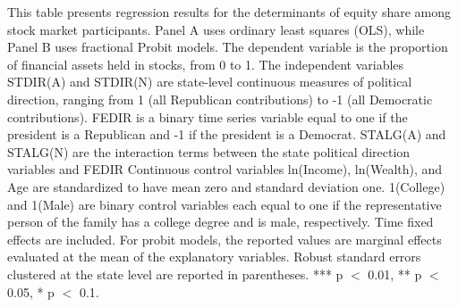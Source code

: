 \begin{table}[htbp]
    \centering
    \caption{Equity Share and State Politics}
    \label{tab:4}

    \begin{minipage}{\textwidth}
    \small This table presents regression results for the determinants of equity share among stock market participants. Panel A uses ordinary least squares (OLS), while Panel B uses fractional Probit models. The dependent variable is the proportion of financial assets held in stocks, from 0 to 1. The independent variables STDIR(A) and STDIR(N) are state-level continuous measures of political direction, ranging from 1 (all Republican contributions) to -1 (all Democratic contributions). FEDIR is a binary time series variable equal to one if the president is a Republican and -1 if the president is a Democrat. STALG(A) and STALG(N) are the interaction terms between the state political direction variables and FEDIR Continuous control variables ln(Income), ln(Wealth), and Age are standardized to have mean zero and standard deviation one. 1(College) and 1(Male) are binary control variables each equal to one if the representative person of the family has a college degree and is male, respectively. Time fixed effects are included. For probit models, the reported values are marginal effects evaluated at the mean of the explanatory variables. Robust standard errors clustered at the state level are reported in parentheses. *** p $<$ 0.01, ** p $<$ 0.05, * p $<$ 0.1.
    \end{minipage}

    \small 

    \vspace{1ex}
    
    \begin{subtable}{\textwidth}
        \caption{Ordinary Least Squares (OLS)}
        \label{tab:4a}
        
    \end{subtable}
\end{table}

\begin{table}[htbp]
    \ContinuedFloat
    \centering

    \caption[]{Equity Share and State Politics (Cont.)}
    
    \small
    
    \begin{subtable}{\textwidth}
        \caption{Fractional Probit Model}
        \label{tab:4b}
        
    \end{subtable}

\end{table}

